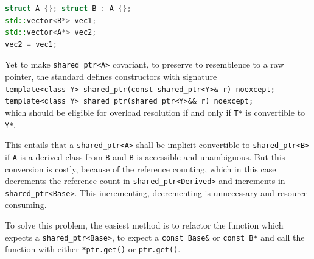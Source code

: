 \begin{lstlisting}[language=c++, frame=single]
struct A {}; struct B : A {};
std::vector<B*> vec1;
std::vector<A*> vec2;
vec2 = vec1;
\end{lstlisting}
\par Yet to make \verb|shared_ptr<A>| covariant, to preserve to resemblence to a raw pointer, the standard defines constructors with signature 
\\ \verb|template<class Y> shared_ptr(const shared_ptr<Y>& r) noexcept;|\\ 
\verb|template<class Y> shared_ptr(shared_ptr<Y>&& r) noexcept;| \\
\cite[\S20.8.2.2.1]{cpp_standard}
which should be eligible for overload resolution if and only  if \verb|T*| is convertible to \verb|Y*|. \medskip
\par This entails that a \verb|shared_ptr<A>| shall be implicit convertible to \verb|shared_ptr<B>| if \verb|A| is a derived class from \verb|B| and \verb|B| is accessible and unambiguous. But this conversion is costly, because of the reference counting, which in this case decrements the reference count in \verb|shared_ptr<Derived>| and increments in \verb|shared_ptr<Base>|. This incrementing, decrementing is unnecessary and resource consuming. \medskip
\par To solve this problem, the easiest method is to refactor the function which expects a \verb|shared_ptr<Base>|, to expect a \verb|const Base&| or \verb|const B*| and call the function with either \verb|*ptr.get()| or \verb|ptr.get()|.
